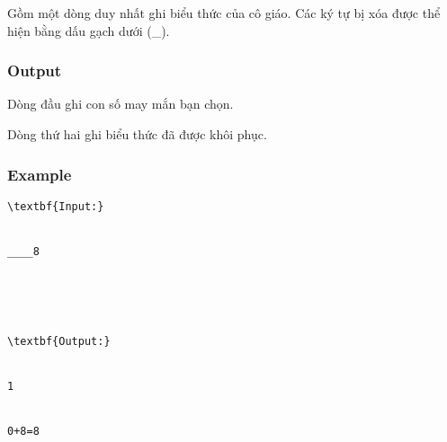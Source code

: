    Gồm một dòng duy nhất ghi biểu thức của cô giáo. Các ký tự bị xóa được thể hiện bằng dấu gạch dưới (\_).  

\subsubsection{   Output  }

   Dòng đầu ghi con số may mắn bạn chọn.   


   Dòng thứ hai ghi biểu thức đã được khôi phục.  

\subsubsection{   Example  }
\begin{verbatim}
\textbf{Input:}


____8





\textbf{Output:}


1


0+8=8


\end{verbatim}
